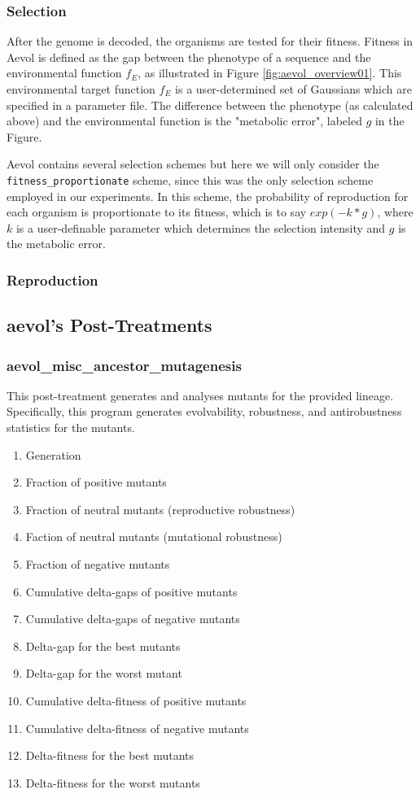 \subsubsection{Selection}
After the genome is decoded, the organisms are tested for their fitness. Fitness in Aevol is defined as the gap between the phenotype of a sequence and the environmental function $f_E$, as illustrated in Figure \ref{fig:aevol_overview01}. This environmental target function $f_E$ is a user-determined set of Gaussians which are specified in a parameter file. The difference between the phenotype (as calculated above) and the environmental function is the "metabolic error", labeled $g$ in the Figure. 

Aevol contains several selection schemes but here we will only consider the \texttt{fitness\_proportionate} scheme, since this was the only selection scheme employed in our experiments. In this scheme, the probability of reproduction for each organism is proportionate to its fitness, which is to say $exp(-k * g)$, where $k$ is a user-definable parameter which determines the selection intensity and $g$ is the metabolic error.
\subsubsection{Reproduction}

\subsection{aevol's Post-Treatments}\label{aevol_post-treatments}

\subsubsection{aevol\_misc\_ancestor\_mutagenesis}
This post-treatment generates and analyses mutants for the provided lineage. Specifically, this program generates evolvability, robustness, and antirobustness statistics for the mutants. 
\begin{enumerate}
	\item Generation
	\item Fraction of positive mutants
	\item Fraction of neutral mutants (reproductive robustness)
	\item Faction of neutral mutants (mutational robustness)
	\item Fraction of negative mutants
	\item Cumulative delta-gaps of positive mutants
	\item Cumulative delta-gaps of negative mutants
	\item Delta-gap for the best mutants
	\item Delta-gap for the worst mutant
	\item Cumulative delta-fitness of positive mutants
	\item Cumulative delta-fitness of negative mutants
	\item Delta-fitness for the best mutants
	\item Delta-fitness for the worst mutants
\end{enumerate}
